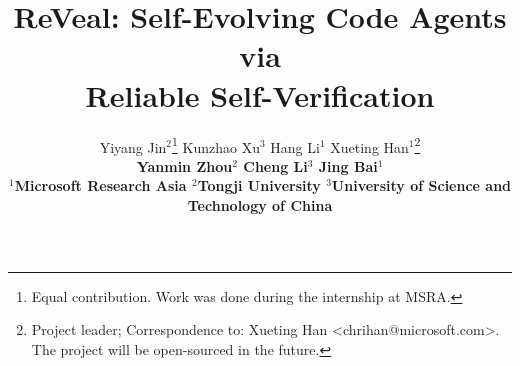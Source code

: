 \documentclass{article} %
\title{ReVeal: Self-Evolving Code Agents via \\Reliable Self-Verification}
\author{%
  Yiyang Jin$^{2}$\thanks{Equal contribution. Work was done during the internship at MSRA.}\quad\quad
  Kunzhao Xu$^{3}$\footnotemark[1]\quad\quad
  Hang Li$^{1}$\quad\quad
  Xueting Han$^{1}$\thanks{Project leader; Correspondence to: Xueting Han <chrihan@microsoft.com>. The project will be open-sourced in the future.}\quad\quad \\\bf
  Yanmin Zhou$^{2}$\quad\quad
  Cheng Li$^{3}$\quad\quad
  Jing Bai$^{1}$ \\
  [6pt]
  $^{1}$Microsoft Research Asia\hspace{4pt}
  $^{2}$Tongji University\hspace{4pt}
  $^{3}$University of Science and Technology of China
}
\begin{document}
\maketitle

\begin{abstract}


\end{abstract}
\end{document}
